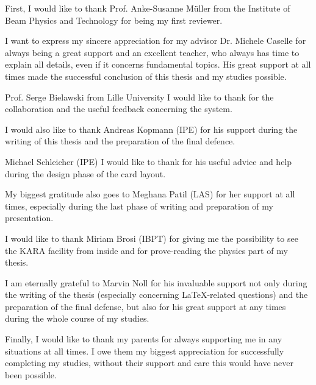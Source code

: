 First, I would like to thank Prof. Anke-Susanne Müller from the Institute of Beam Physics and Technology for being my first reviewer.

I want to express my sincere appreciation for my advisor Dr. Michele Caselle for always being a great support and an excellent teacher, who always has time to explain all details, even if it concerns fundamental topics. 
His great support at all times made the successful conclusion of this thesis and my studies possible.

Prof. Serge Bielawski from Lille University I would like to thank for the collaboration and the useful feedback concerning the system.

I would also like to thank Andreas Kopmann (IPE) for his support during the writing of this thesis and the preparation of the final defence.

Michael Schleicher (IPE) I would like to thank for his useful advice and help during the design phase of the card layout.

My biggest gratitude also goes to Meghana Patil (LAS)  for her support at all times, especially during the last phase of writing and preparation of my presentation.

I would like to thank Miriam Brosi (IBPT) for giving me the possibility to see the KARA facility from inside and for prove-reading the physics part of my thesis.

I am eternally grateful to Marvin Noll for his invaluable support not only during the writing of the thesis (especially concerning LaTeX-related questions) and the preparation of the final defense, but also for his great support at any times during the whole course of my studies.

Finally, I would like to thank my parents for always supporting me in any situations at all times. I owe them my biggest appreciation for successfully completing my studies, without their support and care this would have never been possible.
